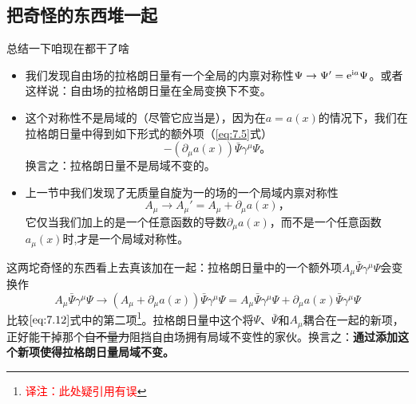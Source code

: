 \subsection{把奇怪的东西堆一起}\label{sec7.1.3}
总结一下咱现在都干了啥
\begin{itemize}
\item 我们发现\spint 自由场的拉格朗日量有一个全局的内禀对称性$\Psi\rightarrow\Psi' = \mathrm e^{\mathrm i a}\Psi$。或者这样说：\spint 自由场的拉格朗日量在全局\uo 变换下不变。
\item 这个对称性不是局域的（尽管它应当是），因为在$a=a(x)$的情况下，我们在拉格朗日量中得到如下形式的额外项（\ref{eq:7.5}式）
\begin{equation}
-(\partial_\mu a(x))\bar\Psi\gamma^\mu\Psi \text{。}
\label{eq:7.12}
\end{equation}
换言之：拉格朗日量不是局域\uo 不变的。
\item 上一节中我们发现了无质量自旋为一的场的一个局域内禀对称性
\begin{equation}
A_\mu \rightarrow A_\mu' = A_\mu +\partial_\mu a(x) \text{，}
\end{equation}
它仅当我们加上的是一个任意函数的导数$\partial_\mu a(x)$，而不是一个任意函数$a_\mu(x)$时,才是一个局域对称性。
\end{itemize}
这两坨奇怪的东西看上去真该加在一起：拉格朗日量中的一个额外项$A_\mu\bar\Psi\gamma^\mu\Psi$会变换作
\begin{equation}
A_\mu\bar\Psi\gamma^\mu\Psi \rightarrow (A_\mu+\partial_\mu a(x))\bar\Psi\gamma^\mu\Psi = A_\mu\bar\Psi\gamma^\mu\Psi + \partial_\mu a(x)\bar\Psi\gamma^\mu\Psi
\end{equation}
比较$\ref{eq:7.12}$式中的第二项\footnote{\textcolor{red}{译注：此处疑引用有误}}。拉格朗日量中这个将$\Psi$、$\bar\Psi$和$A_\mu$耦合在一起的新项，正好能干掉那个\sout{自不量力}阻挡\spint 自由场拥有局域\uo 不变性的家伙。换言之：{\bf 通过添加这个新项使得拉格朗日量局域\uo 不变。}

